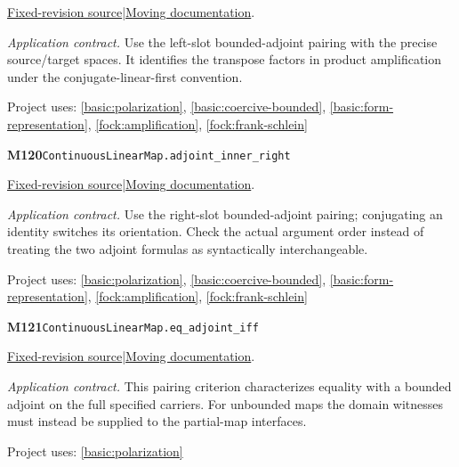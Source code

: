 \documentclass[11pt,a4paper]{article}
\theoremstyle{definition}
\theoremstyle{remark}
\begin{document}
\href{https://github.com/leanprover-community/mathlib4/blob/9bac2d0692944a775113f7c130fd5e5b4608a854/Mathlib/Analysis/InnerProductSpace/Adjoint.lean}{Fixed-revision source}\quad|\quad\href{https://leanprover-community.github.io/mathlib4_docs/Mathlib/Analysis/InnerProductSpace/Adjoint.html#ContinuousLinearMap.adjoint_inner_left}{Moving documentation}.\par
\noindent\textit{Application contract.} Use the left-slot bounded-adjoint pairing with the precise source/target spaces. It identifies the transpose factors in product amplification under the conjugate-linear-first convention.\par
{\small Project uses: \ref{basic:polarization}, \ref{basic:coercive-bounded}, \ref{basic:form-representation}, \ref{fock:amplification}, \ref{fock:frank-schlein}}\par\medskip

\noindent\textbf{M120}\label{base:M120}\quad\nolinkurl{ContinuousLinearMap.adjoint_inner_right}

\href{https://github.com/leanprover-community/mathlib4/blob/9bac2d0692944a775113f7c130fd5e5b4608a854/Mathlib/Analysis/InnerProductSpace/Adjoint.lean}{Fixed-revision source}\quad|\quad\href{https://leanprover-community.github.io/mathlib4_docs/Mathlib/Analysis/InnerProductSpace/Adjoint.html#ContinuousLinearMap.adjoint_inner_right}{Moving documentation}.\par
\noindent\textit{Application contract.} Use the right-slot bounded-adjoint pairing; conjugating an identity switches its orientation. Check the actual argument order instead of treating the two adjoint formulas as syntactically interchangeable.\par
{\small Project uses: \ref{basic:polarization}, \ref{basic:coercive-bounded}, \ref{basic:form-representation}, \ref{fock:amplification}, \ref{fock:frank-schlein}}\par\medskip

\noindent\textbf{M121}\label{base:M121}\quad\nolinkurl{ContinuousLinearMap.eq_adjoint_iff}

\href{https://github.com/leanprover-community/mathlib4/blob/9bac2d0692944a775113f7c130fd5e5b4608a854/Mathlib/Analysis/InnerProductSpace/Adjoint.lean}{Fixed-revision source}\quad|\quad\href{https://leanprover-community.github.io/mathlib4_docs/Mathlib/Analysis/InnerProductSpace/Adjoint.html#ContinuousLinearMap.eq_adjoint_iff}{Moving documentation}.\par
\noindent\textit{Application contract.} This pairing criterion characterizes equality with a bounded adjoint on the full specified carriers. For unbounded maps the domain witnesses must instead be supplied to the partial-map interfaces.\par
{\small Project uses: \ref{basic:polarization}}\par\medskip
\end{document}

